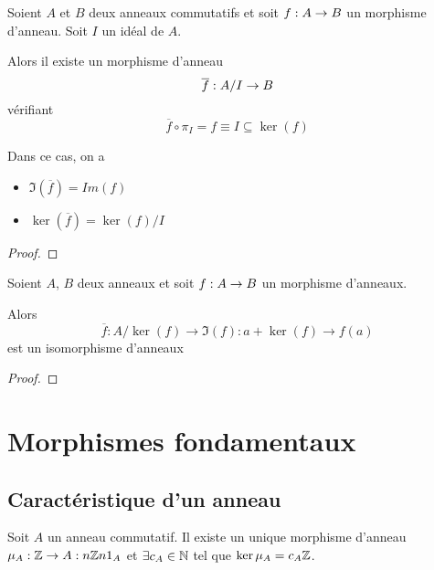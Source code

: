 \begin{proposition}
	Soient $A$ et $B$ deux anneaux commutatifs et soit $f : A \rightarrow B$ un
	morphisme d'anneau.
	Soit $I$ un idéal de $A$.

	Alors il existe un morphisme d'anneau
	\begin{equation}
		\overline{f} : A / I \rightarrow B
	\end{equation}
	vérifiant
	\begin{equation}
		\overline{f} \circ \pi_{I} = f \equiv I \subseteq \ker(f)
	\end{equation}

	Dans ce cas, on a
	\begin{itemize}
		\item $\Im(\overline{f}) = Im(f)$
		\item $\ker(\overline{f}) = \ker(f) / I$
	\end{itemize}
\end{proposition}

\ifdefined\outputproof
\begin{proof}

\end{proof}
\fi

\begin{corollary}
	Soient $A$, $B$ deux anneaux et soit $f : A \rightarrow B$ un morphisme
	d'anneaux.

	Alors
	\begin{equation}
		\overline{f} : A / \ker(f) \rightarrow \Im(f) : a + \ker(f) \rightarrow
		f(a)
	\end{equation}
	est un isomorphisme d'anneaux
\end{corollary}

\ifdefined\outputproof
\begin{proof}

\end{proof}
\fi

\section{Morphismes fondamentaux}

\subsection{Caractéristique d'un anneau}
\label{subsection:ring_caracteristic}

\begin{proposition}
	Soit $A$ un anneau commutatif. Il existe un unique morphisme d'anneau
	$\mu_{A} : \mathbb{Z} \rightarrow A : n \mathbb{Z} n 1_{A}$ et $\exists c_{A} \in
	\mathbb{N}$ tel que $\ker{\mu_{A}} = c_{A} \mathbb{Z}$.
\end{proposition}

